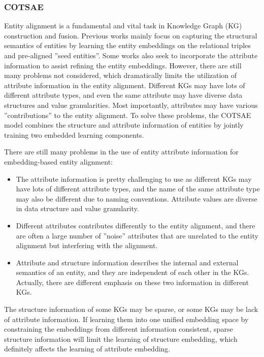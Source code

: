 \documentclass[sigconf]{acmart}
\begin{document}
{\subsubsection{COTSAE \cite{yang2020cotsae}}

Entity alignment is a fundamental and vital task in Knowledge Graph (KG) construction and fusion. Previous works mainly focus on capturing the structural semantics of entities by learning the entity embeddings on the relational triples and pre-aligned ”seed entities”. Some works also seek to incorporate the attribute information to assist refining the entity embeddings. However, there are still many problems not considered, which dramatically limits the utilization of attribute information in the entity alignment. Different KGs may have lots of different attribute types, and even the same attribute may have diverse data structures and value granularities. Most importantly, attributes may have various ”contributions” to the entity alignment. To solve these problems, the COTSAE model combines the structure and attribute information of entities by jointly training two embedded learning components. 

There are still many problems in the use of entity attribute information for embedding-based entity alignment: 
\begin{itemize}
\item The attribute information is pretty challenging to use as different KGs may have lots of different attribute types, and the name of the same attribute type may also be different due to naming conventions. Attribute values are diverse in data structure and value granularity.
\item Different attributes contributes differently to the entity alignment, and there are often a large number of ”noise” attributes that are unrelated to the entity alignment but interfering with the alignment.
\item Attribute and structure information describes the internal and external semantics of an entity, and they are independent of each other in the KGs. Actually, there are different emphasis on these two information in different KGs.
\end{itemize}

The structure information of some KGs may be sparse, or some KGs may be lack of attribute information. If learning them into one unified embedding space by constraining the embeddings from different information consistent,  sparse structure information will limit the learning of structure embedding, which definitely affects the learning of attribute embedding.

}
\end{document}
